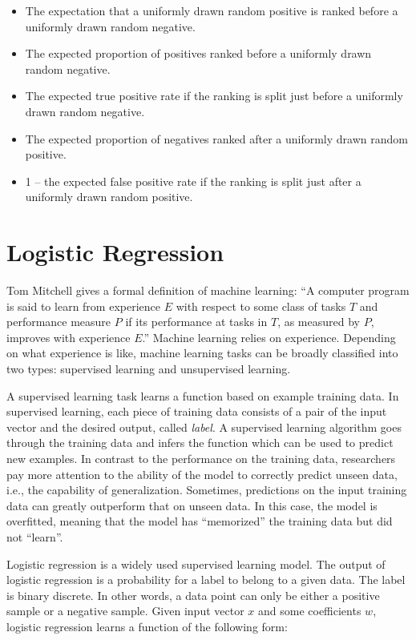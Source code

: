         \begin{itemize}
            \item The expectation that a uniformly drawn random positive is ranked before a uniformly drawn random negative.
            \item The expected proportion of positives ranked before a uniformly drawn random negative.
            \item The expected true positive rate if the ranking is split just before a uniformly drawn random negative.
            \item The expected proportion of negatives ranked after a uniformly drawn random positive.
            \item 1 – the expected false positive rate if the ranking is split just after a uniformly drawn random positive.
        \end{itemize}


\section{Logistic Regression}

    Tom Mitchell gives a formal definition of machine learning:
    ``A computer program is said to learn from experience $E$ with respect to some class of tasks $T$
    and performance measure $P$ if its performance at tasks in $T$, as measured by $P$, improves with experience $E$.''
    \cite{Mitchell1997}
    Machine learning relies on experience.
    Depending on what experience is like, machine learning tasks can be broadly classified into two types:
    supervised learning and unsupervised learning.

    A supervised learning task learns a function based on example training data.
    In supervised learning, each piece of training data consists of a pair of the input vector
    and the desired output, called \emph{label}.
    A supervised learning algorithm goes through the training data and infers the function
    which can be used to predict new examples.
    In contrast to the performance on the training data,
    researchers pay more attention to the ability of the model to correctly predict unseen data,
    i.e., the capability of generalization.
    Sometimes, predictions on the input training data can greatly outperform that on unseen data.
    In this case, the model is overfitted, meaning that the model has ``memorized'' the training data
    but did not ``learn''.

    Logistic regression is a widely used supervised learning model.
    The output of logistic regression is a probability for a label to belong to a given data.
    The label is binary discrete.
    In other words, a data point can only be either a positive sample or a negative sample.
    Given input vector $x$ and some coefficients $w$,
    logistic regression learns a function of the following form:

